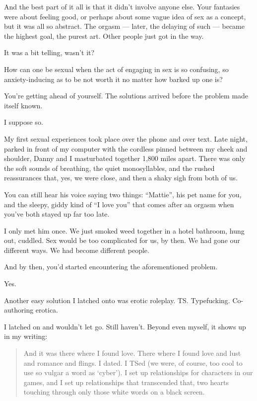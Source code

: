 \begin{paracol}{2}
\begin{leftcolumn}
\begin{ally}
And the best part of it all is that it didn't involve anyone else. Your fantasies were about feeling good, or perhaps about some vague idea of sex as a concept, but it was all so abstract. The orgasm --- later, the delaying of such --- became the highest goal, the purest art. Other people just got in the way.
\end{ally}
It was a bit telling, wasn't it?
\newpage

\noindent How can one be sexual when the act of engaging in sex is so confusing, so anxiety-inducing as to be not worth it no matter how barked up one is?

\begin{ally}
You're getting ahead of yourself. The solutions arrived before the problem made itself known.
\end{ally}
I suppose so.

My first sexual experiences took place over the phone and over text. Late night, parked in front of my computer with the cordless pinned between my cheek and shoulder, Danny and I masturbated together 1,800 miles apart. There was only the soft sounds of breathing, the quiet monosyllables, and the rushed reassurances that, yes, we were close, and then a shaky sigh from both of us.

\begin{ally}
You can still hear his voice saying two things: ``Mattie'', his pet name for you, and the sleepy, giddy kind of ``I love you'' that comes after an orgasm when you've both stayed up far too late.
\end{ally}
I only met him once. We just smoked weed together in a hotel bathroom, hung out, cuddled. Sex would be too complicated for us, by then. We had gone our different ways. We had become different people.

\begin{ally}
And by then, you'd started encountering the aforementioned problem.
\end{ally}
Yes.

Another easy solution I latched onto was erotic roleplay. TS. Typefucking. Co-authoring erotica.

I latched on and wouldn't let go. Still haven't. Beyond even myself, it shows up in my writing:

\begin{quotation}
  \noindent And it was there where I found love. There where I found love and lust and romance and flings. I dated. I TSed (we were, of course, too cool to use so vulgar a word as ‘cyber’). I set up relationships for characters in our games, and I set up relationships that transcended that, two hearts touching through only those white words on a black screen.


\end{quotation}
\end{leftcolumn}
\end{paracol}

